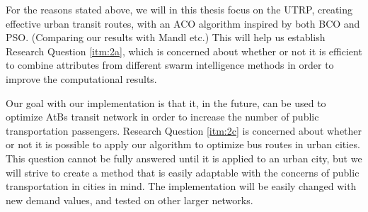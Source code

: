 For the reasons stated above, we will in this thesis focus on the UTRP, creating effective urban transit routes, with an ACO algorithm inspired by both BCO and PSO. (Comparing our results with Mandl etc.) This will help us establish Research Question \vref{itm:2a}, which is concerned about whether or not it is efficient to combine attributes from different swarm intelligence methods in order to improve the computational results.

Our goal with our implementation is that it, in the future, can be used to optimize AtBs transit network in order to increase the number of public transportation passengers. Research Question \vref{itm:2c} is concerned about whether or not it is possible to apply our algorithm to optimize bus routes in urban cities. This question cannot be fully answered until it is applied to an urban city, but we will strive to create a method that is easily adaptable with the concerns of public transportation in cities in mind. The implementation will be easily changed with new demand values, and tested on other larger networks.

